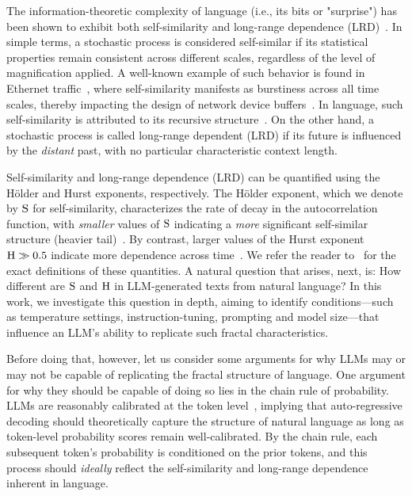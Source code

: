 The information-theoretic complexity of language (i.e., its bits or "surprise") has been shown to exhibit both self-similarity and long-range dependence (LRD)~\citep{alabdulmohsin2024fractals}. In simple terms, a stochastic process is considered self-similar if its statistical properties remain consistent across different scales, regardless of the level of magnification applied. A well-known example of such behavior is found in Ethernet traffic~\citep{crovella1995explaining,leland1994self,paxson1995wide,willinger1997self}, where self-similarity manifests as burstiness across all time scales, thereby impacting the design of network device buffers~\citep{wilson2004high}. In language, such self-similarity is attributed to its recursive structure~\citep{altmann2012origin,willinger1995self}. On the other hand, a stochastic process is called long-range dependent (LRD) if its future is influenced by the \emph{distant} past, with no particular characteristic context length. 

Self-similarity and long-range dependence (LRD) can be quantified using the H\"older and Hurst exponents, respectively. The H\"older exponent, which we denote by $\mathrm{S}$ for self-similarity, characterizes the rate of decay in the autocorrelation function, with \emph{smaller} values of $\mathrm{S}$ indicating a \emph{more} significant self-similar structure (heavier tail)~\citep{watkins2019mandelbrot}. By contrast, larger values of the Hurst exponent $\mathrm{H}\gg0.5$ indicate more dependence across time~\citep{hurst1951long}. We refer the reader to~\cite{alabdulmohsin2024fractals} for the exact definitions of these quantities.
A natural question that arises, next, is: How different are $\mathrm{S}$ and $\mathrm{H}$ in LLM-generated texts from natural language? In this work, we investigate this question in depth, aiming to identify conditions---such as temperature settings, instruction-tuning, prompting and model size---that influence an LLM’s ability to replicate such fractal characteristics.

Before doing that, however, let us consider some arguments for why LLMs may or may not be capable of replicating the fractal structure of language. One argument for why they should be capable of doing so lies in the chain rule of probability. LLMs are reasonably calibrated at the token level~\citep{kadavath2022language}, implying that auto-regressive decoding should theoretically capture the structure of natural language as long as token-level probability scores remain well-calibrated. By the chain rule, each subsequent token's probability is conditioned on the prior tokens, and this process should \emph{ideally} reflect the self-similarity and long-range dependence inherent in language.

